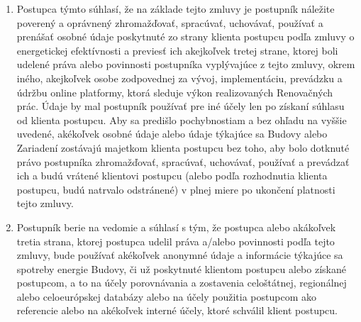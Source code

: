 \documentclass[a4paper]{article}
\begin{document}
\begin{multicols}{2}
\begin{enumerate}
    \item{Postupca týmto súhlasí, že na základe tejto zmluvy je postupník náležite poverený a oprávnený zhromažďovať, spracúvať, uchovávať, používať a prenášať osobné údaje poskytnuté zo strany klienta postupcu podľa zmluvy o energetickej efektívnosti a previesť ich akejkoľvek tretej strane, ktorej boli udelené práva alebo povinnosti postupníka vyplývajúce z tejto zmluvy, okrem iného, akejkoľvek osobe zodpovednej za vývoj, implementáciu, prevádzku a údržbu online platformy, ktorá sleduje výkon realizovaných Renovačných prác. Údaje by mal postupník používať pre iné účely len po získaní súhlasu od klienta postupcu. Aby sa predišlo pochybnostiam a bez ohľadu na vyššie uvedené, akékoľvek osobné údaje alebo údaje týkajúce sa Budovy alebo Zariadení zostávajú majetkom klienta postupcu bez toho, aby bolo dotknuté právo postupníka zhromažďovať, spracúvať, uchovávať, používať a prevádzať ich a budú vrátené klientovi postupcu (alebo podľa rozhodnutia klienta postupcu, budú natrvalo odstránené) v plnej miere po ukončení platnosti tejto zmluvy.}
    \item{Postupník berie na vedomie a súhlasí s tým, že postupca alebo akákoľvek tretia strana, ktorej postupca udelil práva a/alebo povinnosti podľa tejto zmluvy, bude používať akékoľvek anonymné údaje a informácie týkajúce sa spotreby energie Budovy, či už poskytnuté klientom postupcu alebo získané postupcom, a to na účely porovnávania a zostavenia celoštátnej, regionálnej alebo celoeurópskej databázy alebo na účely použitia postupcom ako referencie alebo na akékoľvek interné účely, ktoré schválil klient postupcu.}
\end{enumerate}


\end{multicols}
\end{document}

